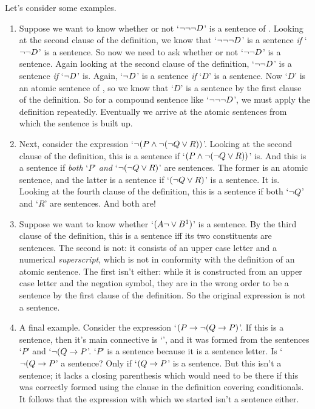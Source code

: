 Let's consider some examples.

\begin{enumerate}
	\item Suppose we want to know whether or not `$\neg \neg \neg D$' is a sentence of \TFL. Looking at the second clause of the definition, we know that `$\neg \neg \neg D$' is a sentence \emph{if} `$\neg \neg D$' is a sentence. So now we need to ask whether or not `$\neg \neg D$' is a sentence. Again looking at the second clause of the definition, `$\neg \neg D$' is a sentence \emph{if} `$\neg D$' is. Again, `$\neg D$' is a sentence \emph{if} `$D$' is a sentence. Now `$D$' is an atomic sentence of \TFL, so we know that `$D$' is a sentence by the first clause of the definition. So for a compound sentence like `$\neg \neg \neg D$', we must apply the definition repeatedly. Eventually we arrive at the atomic sentences from which the sentence is built up.
	\item Next, consider the expression `$\neg (P \wedge \neg (\neg Q \vee R))$'. Looking at the second clause of the definition, this is a sentence if `$(P \wedge \neg (\neg Q \vee R))$' is. And this is a sentence if \emph{both} `$P$' \emph{and} `$\neg (\neg Q \vee R)$' are sentences. The former is an atomic sentence, and the latter is a sentence if `$(\neg Q \vee R)$' is a sentence. It is. Looking at the fourth clause of the definition, this is a sentence if both `$\neg Q$' and `$R$' are sentences. And both are!
	\item Suppose we want to know whether `$(A\neg \vee B^{1})$' is a sentence. By the third clause of the definition, this is a sentence iff its two constituents are sentences. The second is not: it consists of an upper case letter and a numerical \emph{superscript}, which is not in conformity with the definition of an atomic sentence. The first isn't either: while it is constructed from an upper case letter and the negation symbol, they are in the wrong order to be a sentence by the first clause of the definition. So the original expression is not a sentence.
	\item A final example. Consider the expression `$(P \rightarrow \neg(Q \rightarrow P)$'. If this is a sentence, then it's main connective is `\eif', and it was formed from the sentences `$P$' and `$\neg(Q \rightarrow P$'. `$P$' is a sentence because it is a sentence letter. Is `$\neg(Q \rightarrow P$' a sentence? Only if `$(Q \rightarrow P$' is a sentence. But this isn't a sentence; it lacks a closing parenthesis which would need to be there if this was correctly formed using the clause in the definition covering conditionals. It follows that the expression with which we started isn't a sentence either.
\end{enumerate}




